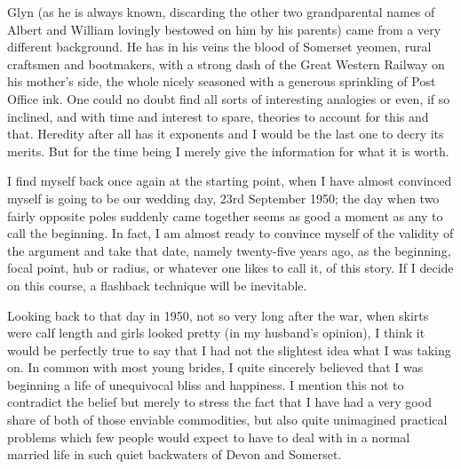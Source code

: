 Glyn (as he is always known, discarding the other two grandparental names of Albert and William lovingly bestowed on him by his parents) came from a very different background. He has in his veins the blood of Somerset yeomen, rural craftsmen and bootmakers, with a strong dash of the Great Western Railway on his mother's side, the whole nicely seasoned with a generous sprinkling of Post Office ink. One could no doubt find all sorts of interesting analogies or even, if so inclined, and with time and interest to spare, theories to account for this and that. Heredity after all has it exponents and I would be the last one to decry its merits. But for the time being I merely give the information for what it is worth.

I find myself back once again at the starting point, when I have almost convinced myself is going to be our wedding day, 23rd September 1950; the day when two fairly opposite poles suddenly came together seems as good a moment as any to call the beginning. In fact, I am almost ready to convince myself of the validity of the argument and take that date, namely twenty-five years ago, as the beginning, focal point, hub or radius, or whatever one likes to call it, of this story. If I decide on this course, a flashback technique will be inevitable.

Looking back to that day in 1950, not so very long after the war, when skirts were calf length and girls looked pretty (in my husband's opinion), I think it would be perfectly true to say that I had not the slightest idea what I was taking on. In common with most young brides, I quite sincerely believed that I was beginning a life of unequivocal bliss and happiness. I mention this not to contradict the belief but merely to stress the fact that I have had a very good share of both of those enviable commodities, but also quite unimagined practical problems which few people would expect to have to deal with in a normal married life in such quiet backwaters of Devon and Somerset. 